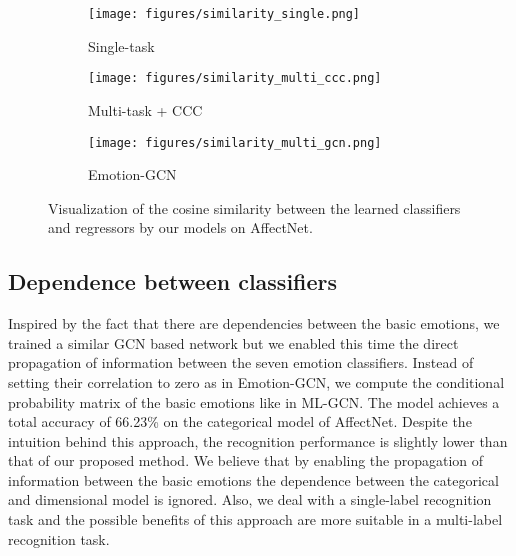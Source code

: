\documentclass[a4paper, 10pt, conference]{ieeeconf}      \usepackage{FG2021}
\begin{document}
\begin{figure*}[t]
     \centering
     \begin{subfigure}[b]{0.32\textwidth}
         \centering
         \texttt{[image: figures/similarity\_single.png]}
         \caption{Single-task}
         \label{fig:similarity_single}
     \end{subfigure}
     \hfill
     \begin{subfigure}[b]{0.32\textwidth}
         \centering
         \texttt{[image: figures/similarity\_multi\_ccc.png]}
         \caption{Multi-task + CCC}
         \label{fig:similarity_multi}
     \end{subfigure}
     \hfill
     \begin{subfigure}[b]{0.32\textwidth}
         \centering
         \texttt{[image: figures/similarity\_multi\_gcn.png]}
         \caption{Emotion-GCN}
         \label{fig:similarity_gcn}
     \end{subfigure}
    \caption{Visualization of the cosine similarity between the learned classifiers and regressors by our models on AffectNet.}
    \label{fig:similarity}
\end{figure*}

\subsection{Dependence between classifiers}

Inspired by the fact that there are dependencies between the basic emotions, we trained a similar GCN based network but we enabled this time the direct propagation of information between the seven emotion classifiers. Instead of setting their correlation to zero as in Emotion-GCN, we compute the conditional probability matrix of the basic emotions like in ML-GCN. The model achieves a total accuracy of 66.23\% on the categorical model of AffectNet. Despite the intuition behind this approach, the recognition performance is slightly lower than that of our proposed method. We believe that by enabling the propagation of information between the basic emotions the dependence between the categorical and dimensional model is ignored. Also, we deal with a single-label recognition task and the possible benefits of this approach are more suitable in a multi-label recognition task.
\end{document}
